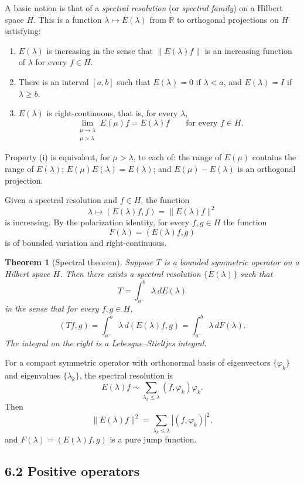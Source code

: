 \documentclass[11pt,openany]{book}
\newtheorem{theorem}{Theorem}[section]
\begin{document}
A basic notion is that of a \emph{spectral resolution} (or \emph{spectral family}) on a Hilbert space $H$. This is a function $\lambda\mapsto E(\lambda)$ from $\mathbb R$ to orthogonal projections on $H$ satisfying:
\begin{enumerate}
\item[(i)] $E(\lambda)$ is increasing in the sense that $\|E(\lambda)f\|$ is an increasing function of $\lambda$ for every $f\in H$.
\item[(ii)] There is an interval $[a,b]$ such that $E(\lambda)=0$ if $\lambda<a$, and $E(\lambda)=I$ if $\lambda\geq b$.
\item[(iii)] $E(\lambda)$ is right-continuous, that is, for every $\lambda$,
\[
\lim_{\substack{\mu\to\lambda\\\mu>\lambda}}E(\mu)f=E(\lambda)f
\qquad\text{for every }f\in H.
\]
\end{enumerate}
Property (i) is equivalent, for $\mu>\lambda$, to each of: the range of $E(\mu)$ contains the range of $E(\lambda)$; $E(\mu)E(\lambda)=E(\lambda)$; and $E(\mu)-E(\lambda)$ is an orthogonal projection.

Given a spectral resolution and $f\in H$, the function
\[
\lambda\longmapsto(E(\lambda)f,f)=\|E(\lambda)f\|^2
\]
is increasing. By the polarization identity, for every $f,g\in H$ the function
\[
F(\lambda)=(E(\lambda)f,g)
\]
is of bounded variation and right-continuous.

\begin{theorem}[Spectral theorem]
Suppose $T$ is a bounded symmetric operator on a Hilbert space $H$. Then there exists a spectral resolution $\{E(\lambda)\}$ such that
\[
T=\int_{a^-}^{b}\lambda\,dE(\lambda)
\]
in the sense that for every $f,g\in H$,
\begin{equation}
(Tf,g)
=\int_{a^-}^{b}\lambda\,d(E(\lambda)f,g)
=\int_{a^-}^{b}\lambda\,dF(\lambda).
\tag{32}
\end{equation}
The integral on the right is a Lebesgue--Stieltjes integral.
\end{theorem}

For a compact symmetric operator with orthonormal basis of eigenvectors $\{\varphi_k\}$ and eigenvalues $\{\lambda_k\}$, the spectral resolution is
\[
E(\lambda)f\sim\sum_{\lambda_k\leq\lambda}(f,\varphi_k)\varphi_k.
\]
Then
\[
\|E(\lambda)f\|^2=\sum_{\lambda_k\leq\lambda}|(f,\varphi_k)|^2,
\]
and $F(\lambda)=(E(\lambda)f,g)$ is a pure jump function.

\subsection*{6.2 Positive operators}
\end{document}
